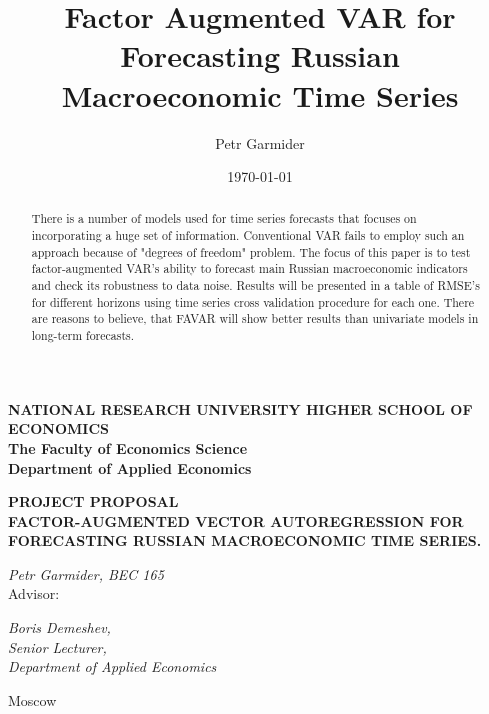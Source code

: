 \documentclass[a4paper, 14pt]{article}
\title{Factor Augmented VAR for Forecasting Russian Macroeconomic Time Series}
\author{Petr Garmider}
\date{\today}
\begin{document}
	\newpage
	\thispagestyle{empty}
	\begin{center}
		
		\vspace{0.1ex}
		
		{\textbf{NATIONAL RESEARCH UNIVERSITY HIGHER SCHOOL OF ECONOMICS}}\\
		\vspace{1ex}
		{\textbf{The Faculty of Economics Science}}\\
		\vspace{1ex}
		{\textbf{
				Department of Applied Economics}}\\
		
	\end{center}
	\vspace{5ex}
	\begin{center}
		\vspace{3ex}
		{\textbf{PROJECT PROPOSAL}}\\
		\vspace{3ex}
		{
			\vspace{2ex} \textbf{FACTOR-AUGMENTED VECTOR AUTOREGRESSION FOR FORECASTING RUSSIAN MACROECONOMIC TIME SERIES.}}
	\end{center}
	\begin{flushright}
		\vspace{5ex}
		\noindent
		\textit{Petr Garmider, BEC 165}
		\\
		\vspace{5ex}
		Advisor:\\
		\vspace{2ex}
		
		\textit{Boris Demeshev, \\Senior Lecturer, \\Department of Applied Economics}\\
		
		
	\end{flushright}

	\vspace{18ex}
	
	\begin{center}
		\vspace{3ex}
		{Moscow}\\
		\vspace{1ex}{28 February 2020}
	\end{center}	
	
	\newpage
	
\begin{abstract}
	There is a number of models used for time series forecasts that focuses on incorporating a huge set of information. Conventional VAR fails to employ such an approach because of "degrees of freedom" problem. The focus of this paper is to test factor-augmented VAR's ability to forecast main Russian macroeconomic indicators and check its robustness to data noise. Results will be presented in a table of RMSE's for different horizons using time series cross validation procedure for each one. There are reasons to believe, that FAVAR will show better results than univariate models in long-term forecasts. 
\end{abstract}
\end{document}
